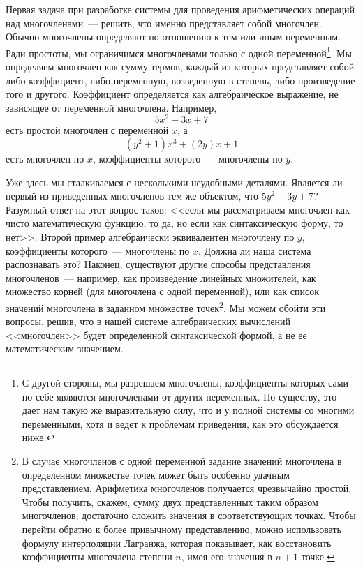 %
%
%
Первая задача при разработке системы для проведения
арифметических операций над многочленами~--- решить, что именно
представляет собой многочлен.  Обычно многочлены определяют по
отношению к тем или иным переменным.  Ради простоты, мы ограничимся
многочленами только с одной 
переменной\footnote{С другой стороны, мы разрешаем многочлены,
коэффициенты которых сами по себе являются многочленами от других
переменных.  По существу, это дает нам такую же выразительную силу, что
и у полной системы со многими переменными, хотя и ведет к проблемам
приведения, как это обсуждается ниже.}.
Мы определяем многочлен как сумму термов, каждый из которых
представляет собой либо коэффициент, либо переменную, возведенную в
степень, либо произведение того и другого.  Коэффициент определяется
как алгебраическое выражение, не зависящее от переменной
многочлена.  Например,
$$
5x^2 + 3x + 7
$$
есть простой многочлен с переменной
$x$, а
$$
(y^2 + 1)x^3 + (2y)x + 1
$$ есть многочлен
по $x$, коэффициенты которого~---  многочлены по
$y$.

Уже здесь мы сталкиваемся с несколькими
неудобными деталями.  Является ли первый из приведенных многочленов
тем же объектом, что $5y^2 + 3y + 7$?  Разумный
ответ на этот вопрос таков: <<если мы
рассматриваем многочлен как чисто математическую функцию, то да, но
если как синтаксическую форму, то нет>>.  Второй пример алгебраически
эквивалентен многочлену по $y$, коэффициенты
которого~---  многочлены по $x$.  Должна ли наша
система распознавать это?  Наконец, существуют другие способы
представления многочленов~---  например, как произведение линейных
множителей, как множество корней (для многочлена с одной переменной),
или как список значений многочлена в заданном множестве точек\footnote{В случае многочленов с одной переменной задание
значений многочлена в определенном множестве точек может быть особенно
удачным представлением.  Арифметика многочленов получается чрезвычайно
простой.  Чтобы получить, скажем, сумму двух представленных таким
образом многочленов, достаточно сложить значения в соответствующих
точках.  Чтобы перейти обратно к более привычному представлению, можно
использовать 
формулу интерполяции Лагранжа, которая
показывает, как
восстановить коэффициенты многочлена степени
$n$, имея его значения в
$n+1$ точке.}.
Мы можем обойти эти вопросы, решив, что в нашей системе алгебраических
вычислений <<многочлен>> будет определенной синтаксической формой, а не
ее математическим значением.

